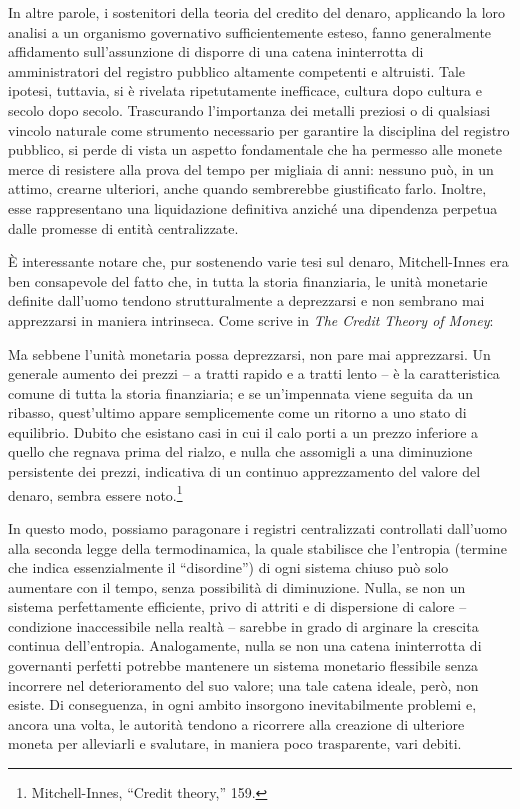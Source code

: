 \documentclass[
  a5paper,
  smalldemyvopaper,10pt,twoside,onecolumn,openright,extrafontsizes,hidelinks]{memoir}
\renewenvironment{quote}%
               {\list{}{\rightmargin=.6cm\leftmargin=.6cm}%
                \itshape \item[]}%
               {\endlist}
\begin{document}
In altre parole, i sostenitori della teoria del credito del denaro,
applicando la loro analisi a un organismo governativo sufficientemente
esteso, fanno generalmente affidamento sull'assunzione di disporre di
una catena ininterrotta di amministratori del registro pubblico
altamente competenti e altruisti. Tale ipotesi, tuttavia, si è rivelata
ripetutamente inefficace, cultura dopo cultura e secolo dopo secolo.
Trascurando l'importanza dei metalli preziosi o di qualsiasi vincolo
naturale come strumento necessario per garantire la disciplina del
registro pubblico, si perde di vista un aspetto fondamentale che ha
permesso alle monete merce di resistere alla prova del tempo per
migliaia di anni: nessuno può, in un attimo, crearne ulteriori, anche
quando sembrerebbe giustificato farlo. Inoltre, esse rappresentano una
liquidazione definitiva anziché una dipendenza perpetua dalle promesse
di entità centralizzate.

È interessante notare che, pur sostenendo varie tesi sul denaro,
Mitchell-Innes era ben consapevole del fatto che, in tutta la storia
finanziaria, le unità monetarie definite dall'uomo tendono
strutturalmente a deprezzarsi e non sembrano mai apprezzarsi in maniera
intrinseca. Come scrive in \emph{The Credit Theory of Money}:

\begin{quote}
Ma sebbene l'unità monetaria possa deprezzarsi, non pare mai
apprezzarsi. Un generale aumento dei prezzi -- a tratti rapido e a
tratti lento -- è la caratteristica comune di tutta la storia
finanziaria; e se un'impennata viene seguita da un ribasso, quest'ultimo
appare semplicemente come un ritorno a uno stato di equilibrio. Dubito
che esistano casi in cui il calo porti a un prezzo inferiore a quello
che regnava prima del rialzo, e nulla che assomigli a una diminuzione
persistente dei prezzi, indicativa di un continuo apprezzamento del
valore del denaro, sembra essere noto.\footnote{Mitchell-Innes, ``Credit
  theory,'' 159.}
\end{quote}

In questo modo, possiamo paragonare i registri centralizzati controllati
dall'uomo alla seconda legge della termodinamica, la quale stabilisce
che l'entropia (termine che indica essenzialmente il ``disordine'') di
ogni sistema chiuso può solo aumentare con il tempo, senza possibilità
di diminuzione. Nulla, se non un sistema perfettamente efficiente, privo
di attriti e di dispersione di calore -- condizione inaccessibile nella
realtà -- sarebbe in grado di arginare la crescita continua
dell'entropia. Analogamente, nulla se non una catena ininterrotta di
governanti perfetti potrebbe mantenere un sistema monetario flessibile
senza incorrere nel deterioramento del suo valore; una tale catena
ideale, però, non esiste. Di conseguenza, in ogni ambito insorgono
inevitabilmente problemi e, ancora una volta, le autorità tendono a
ricorrere alla creazione di ulteriore moneta per alleviarli e svalutare,
in maniera poco trasparente, vari debiti.
\end{document}

